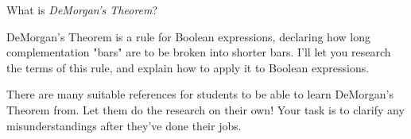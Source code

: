 

What is {\it DeMorgan's Theorem}?







DeMorgan's Theorem is a rule for Boolean expressions, declaring how long complementation "bars" are to be broken into shorter bars.  I'll let you research the terms of this rule, and explain how to apply it to Boolean expressions.







There are many suitable references for students to be able to learn DeMorgan's Theorem from.  Let them do the research on their own!  Your task is to clarify any misunderstandings after they've done their jobs.




